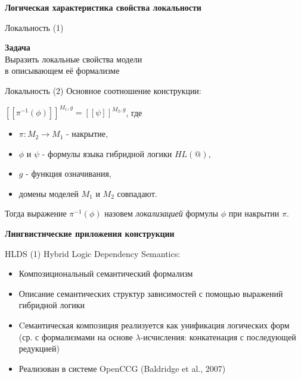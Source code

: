\documentclass{beamer}
\begin{document}
\begin{frame}{}
\begin{center}
	\textbf{Логическая характеристика свойства локальности}
\end{center}
\end{frame}

\begin{frame}{Локальность (1)}
\begin{center}
\textbf{Задача}\\
\bigskip
Выразить локальные свойства модели \\в описывающем её формализме
\end{center}
\end{frame}

\begin{frame}{Локальность (2)}
Основное соотношение конструкции:\\
\bigskip
\begin{center}
$[ \! [ \pi^{-1}(\phi) ] \! ]^{M_1, g} = [ \! [ \psi ] \! ]^{M_2, g}$, где
\end{center}
\bigskip
\begin{itemize}
	\item $\pi : M_2 \to M_1$ - накрытие,
	\item $\phi$ и $\psi$ - формулы языка гибридной логики $HL(@)$,
	\item $g$ - функция означивания,
	\item домены моделей $M_1$ и $M_2$ совпадают.
\end{itemize}
\bigskip
Тогда выражение $\pi^{-1}(\phi)$ назовем \textit{локализацией} формулы $\phi$ при накрытии $\pi$.
\end{frame}


\begin{frame}{}
\begin{center}
	\textbf{Лингвистические приложения конструкции}
\end{center}
\end{frame}

\begin{frame}{HLDS (1)}
Hybrid Logic Dependency Semantics:\\
\bigskip
\begin{itemize}
	\item Композициональный семантический формализм 
	\item Описание семантических структур зависимостей с помощью выражений гибридной логики
	\item Cемантическая композиция реализуется как унификация логических форм (ср. с формализмами на основе $\lambda$-исчисления: конкатенация с последующей редукцией)
	\item Реализован в системе OpenCCG (Baldridge et al., 2007)
\end{itemize}
\end{frame}
\end{document}
